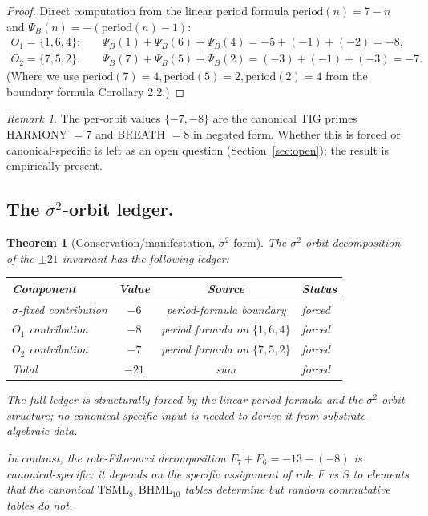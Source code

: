 \documentclass[11pt,reqno]{amsart}
\theoremstyle{plain}
\newtheorem{theorem}{Theorem}[section]
\theoremstyle{definition}
\theoremstyle{remark}
\newtheorem*{remark}{Remark}
\newcommand{\TS}{\mathrm{TSML}}
\newcommand{\BH}{\mathrm{BHML}}
\newcommand{\sig}{\sigma}
\begin{document}
\begin{proof}
Direct computation from the linear period formula
$\mathrm{period}(n) = 7 - n$ and
$\Psi_{B}(n) = -(\mathrm{period}(n) - 1)$:
\begin{align*}
  O_{1} = \{1, 6, 4\}: &\quad
    \Psi_{B}(1) + \Psi_{B}(6) + \Psi_{B}(4) = -5 + (-1) + (-2) = -8,
    \\
  O_{2} = \{7, 5, 2\}: &\quad
    \Psi_{B}(7) + \Psi_{B}(5) + \Psi_{B}(2) = (-3) + (-1) + (-3) = -7.
\end{align*}
(Where we use $\mathrm{period}(7) = 4, \mathrm{period}(5) = 2,
\mathrm{period}(2) = 4$ from the boundary formula
\cite{SandersBridgeWP9} Corollary 2.2.)
\end{proof}

\begin{remark}
The per-orbit values $\{-7, -8\}$ are the canonical TIG primes
HARMONY $= 7$ and BREATH $= 8$ in negated form. Whether this is
forced or canonical-specific is left as an open question
(Section~\ref{sec:open}); the result is empirically present.
\end{remark}

\subsection{The $\sigma^{2}$-orbit ledger.}
\begin{theorem}[Conservation/manifestation, $\sig^{2}$-form]
\label{thm:cm-sigma2}
The $\sig^{2}$-orbit decomposition of the $\pm 21$ invariant has the
following ledger:
\begin{center}
\begin{tabular}{l c c l}
\toprule
Component & Value & Source & Status \\
\midrule
$\sig$-fixed contribution & $-6$ & period-formula boundary & forced \\
$O_{1}$ contribution & $-8$ & period formula on $\{1, 6, 4\}$ & forced \\
$O_{2}$ contribution & $-7$ & period formula on $\{7, 5, 2\}$ & forced \\
\midrule
Total & $-21$ & sum & forced \\
\bottomrule
\end{tabular}
\end{center}
The full ledger is structurally forced by the linear period formula and
the $\sig^{2}$-orbit structure; no canonical-specific input is needed
to derive it from substrate-algebraic data.

In contrast, the role-Fibonacci decomposition
$F_{7} + F_{6} = -13 + (-8)$ is canonical-specific: it depends on the
specific assignment of role $F$ vs $S$ to elements that the canonical
$\TS_{8}, \BH_{10}$ tables determine but random commutative tables do
not.
\end{theorem}
\end{document}
